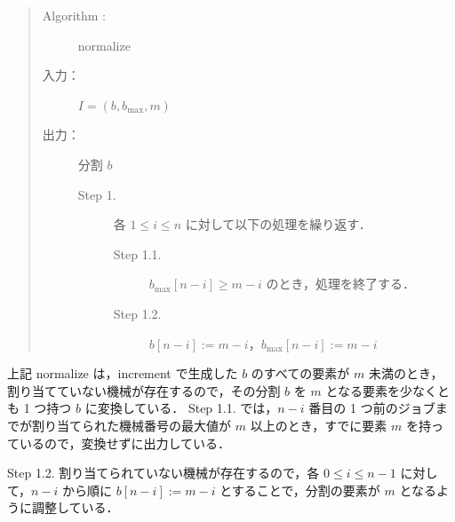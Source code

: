 \documentclass[12pt]{optlab-bachelor}
\begin{document}
\begin{quote}
  \begin{description}
    \item[{\sc Algorithm : }]  {\sc normalize}
    \item[入力：] $I = (b, b_{\max}, m)$
    \item[出力：] 分割 $b$
    \begin{description}
      \item[Step 1.] 各 $1 \le i \le n$ に対して以下の処理を繰り返す．
      \begin{description}
        \item[Step 1.1.] $b_{\max}[n - i] \ge m - i$ のとき，処理を終了する．
        \item[Step 1.2.] $b[n - i] := m - i$，$b_{\max}[n - i] := m - i$
      \end{description}
    \end{description}
  \end{description}
\end{quote}

上記 {\sc normalize} は，{\sc increment} で生成した $b$ のすべての要素が $m$ 未満のとき，割り当てていない機械が存在するので，その分割 $b$ を $m$ となる要素を少なくとも 1 つ持つ $b$ に変換している．
Step 1.1. では，$n - i$ 番目の 1 つ前のジョブまでが割り当てられた機械番号の最大値が $m$ 以上のとき，すでに要素 $m$ を持っているので，変換せずに出力している．

Step 1.2. 割り当てられていない機械が存在するので，各 $0 \le i \le n - 1$ に対して，$n - i$ から順に $b[n-i] := m - i$ とすることで，分割の要素が $m$ となるように調整している．
\end{document}
